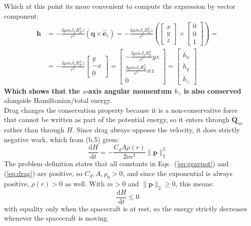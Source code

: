 \documentclass[titlepage]{article}
\begin{document}
\begin{mdframed}[linewidth=1pt, innertopmargin=10pt, innerbottommargin=10pt]
	Which at this point its more convenient to compute the expression by vector component:
	\begin{equation}
		\begin{split}
			\dot{\boldsymbol{h}}&=-\frac{3\mu mJ_2R_E^2z}{r^5}\left(\boldsymbol{q}\times\hat{\boldsymbol{e}}_z\right)=-\frac{3\mu mJ_2R_E^2z}{r^5}\left(\begin{bmatrix}x\\y\\z\end{bmatrix}\times\begin{bmatrix}0\\0\\1\end{bmatrix}\right)=\\
			&=-\frac{3\mu mJ_2R_E^2z}{r^5}\begin{bmatrix}y\\-x\\0\end{bmatrix}=\begin{bmatrix}-\frac{3\mu mJ_2R_E^2}{r^5}yz\\\frac{3\mu mJ_2R_E^2}{r^5}xz\\0\end{bmatrix}=\begin{bmatrix}\dot{h}_x\\\dot{h}_y\\\dot{h}_z\end{bmatrix}
		\end{split}
	\end{equation}
	\textbf{Which shows that the $z$-axis angular momentum $h_z$ is also conserved} alongside Hamiltonian/total energy. \\
	
	Drag changes the conservation property because it is a non-conservative force that cannot be written as part of the potential energy, so it enters through $\boldsymbol{Q}_{nc}$ rather than through $H$. Since drag always opposes the velocity, it does strictly negative work, which from (b.5) gives:
	\begin{equation}
		\frac{\mathrm{d}H}{\mathrm{d}t}=-\frac{C_dA\rho(r)}{2m^3}\|\boldsymbol{p}\|_2^3
	\end{equation}
	The problem definition states that all constants in Eqs.~(\ref{eq:gravpot}) and (\ref{eq:drag}) are positive, so $C_d,A,\rho_0>0$, and since the exponential is always positive, $\rho(r)>0$ as well. With $m>0$ and $\|\boldsymbol{p}\|_2\geq0$, this means:
	\begin{equation}
		\frac{\mathrm{d}H}{\mathrm{d}t}\leq0
	\end{equation}
	with equality only when the spacecraft is at rest, so the energy strictly decreases whenever the spacecraft is moving.
\end{mdframed}
	
\end{document}
